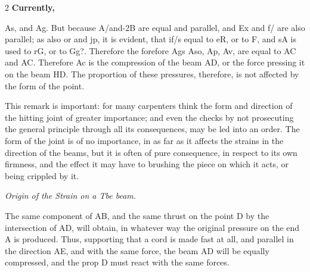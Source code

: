 \documentclass[10pt]{article}
\begin{document}
\begin{multicols}{2}\raggedcolumns
\textbf{Currently,}

As, and Ag. But because A/and-2B are equal and parallel, and Ex and f/ are also parallel; as also or and jp, it is evident, that if/s equal to eR, or to F, and sA is used to rG, or to Gg?. Therefore the forefore Ags Aso, Ap, Av, are equal to AC and AC. Therefore Ac is the compression of the beam AD, or the force pressing it on the beam HD. The proportion of these pressures, therefore, is not affected by the form of the point.

This remark is important: for many carpenters think the form and direction of the hitting joint of greater importance; and even the checks by not prosecuting the general principle through all its consequences, may be led into an order. The form of the joint is of no importance, in as far as it affects the strains in the direction of the beams, but it is often of pure consequence, in respect to its own firmness, and the effect it may have to brushing the piece on which it acts, or being crippled by it.

\begin{center}\small\itshape Origin of the Strain on a Tbe beam.\end{center}
The same component of AB, and the same thrust on the point D by the intersection of AD, will obtain, in whatever way the original pressure on the end A is produced. Thus, supporting that a cord is made fast at all, and parallel in the direction AE, and with the same force, the beam AD will be equally compressed, and the prop D must react with the same forces.


\end{multicols}
\end{document}
